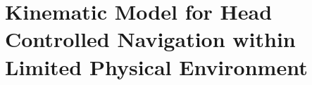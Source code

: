 \chapter{Kinematic Model for Head Controlled Navigation within Limited Physical Environment}
\label{chapter:kinematics}

